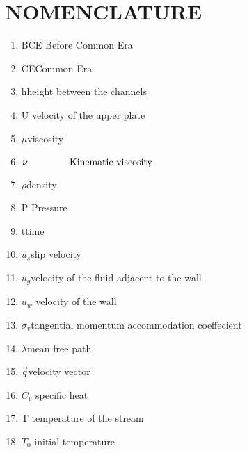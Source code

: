 \documentclass[14pt,one side, a4paper]{extbook}
\begin{document}
		\chapter*{ \centering NOMENCLATURE}
		\begin{enumerate}
			\item {BCE\hspace*{0.5cm} Before Common Era}
			\item {CE\hspace*{1cm}Common Era}
			\item {h\hspace*{1.5cm}height between the channels}
			\item {U\hspace*{1.2cm} velocity of the upper plate}
			\item {$\mu$\hspace*{1.5cm}viscosity}
			\item {$\nu\hspace*{1.4cm}\textrm{ Kinematic viscosity}$}
			\item {$\rho$\hspace*{1.6cm}density}
			\item {P\hspace*{1.4cm} Pressure}
			\item {t\hspace*{1.7cm}time}
			\item {$u_{s}$\hspace*{1.5cm}slip velocity}
			\item {$u_{g}$\hspace*{1.5cm}velocity of the fluid adjacent to the wall}
			\item {$u_w$ \hspace*{1.3cm}velocity of the wall}
			\item {$\sigma_{v}$\hspace*{1.6cm}tangential momentum accommodation coeffecient}
			\item {$\lambda$\hspace*{1.8cm}mean free path}
			\item {$\vec{q}$\hspace*{1.8cm}velocity vector}
			\item {$C_v$ \hspace*{1.3cm} specific heat}
			\item {T\hspace*{1.1cm} temperature of the stream}
			\item {$T_0$\hspace*{1cm} initial temperature}

\end{enumerate}
\end{document}

